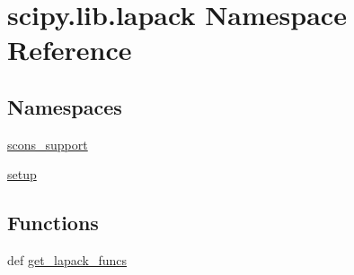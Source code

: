 \hypertarget{namespacescipy_1_1lib_1_1lapack}{}\section{scipy.\+lib.\+lapack Namespace Reference}
\label{namespacescipy_1_1lib_1_1lapack}
\subsection*{Namespaces}
\begin{DoxyCompactItemize}
\item 
 \hyperlink{namespacescipy_1_1lib_1_1lapack_1_1scons__support}{scons\+\_\+support}
\item 
 \hyperlink{namespacescipy_1_1lib_1_1lapack_1_1setup}{setup}
\end{DoxyCompactItemize}
\subsection*{Functions}
\begin{DoxyCompactItemize}
\item 
def \hyperlink{namespacescipy_1_1lib_1_1lapack_a3978edf478323eb87be48df7f590ebcf}{get\+\_\+lapack\+\_\+funcs}
\end{DoxyCompactItemize}

